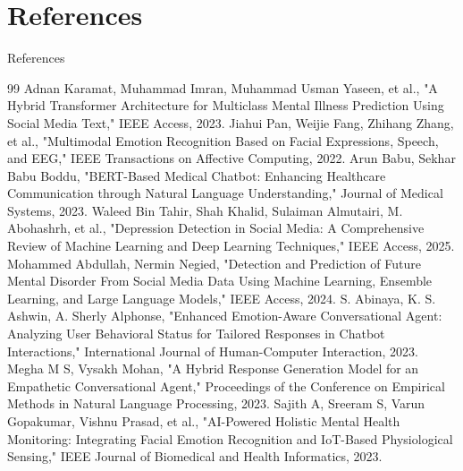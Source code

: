 \documentclass[11pt]{beamer}
\begin{document}
\section{References}
\begin{frame}[allowframebreaks]{References}
    \justifying
    \footnotesize
    \begin{thebibliography}{99}
     Adnan Karamat, Muhammad Imran, Muhammad Usman Yaseen, et al., "A Hybrid Transformer Architecture for Multiclass Mental Illness Prediction Using Social Media Text," IEEE Access, 2023.
     Jiahui Pan, Weijie Fang, Zhihang Zhang, et al., "Multimodal Emotion Recognition Based on Facial Expressions, Speech, and EEG," IEEE Transactions on Affective Computing, 2022.
     Arun Babu, Sekhar Babu Boddu, "BERT-Based Medical Chatbot: Enhancing Healthcare Communication through Natural Language Understanding," Journal of Medical Systems, 2023.
     Waleed Bin Tahir, Shah Khalid, Sulaiman Almutairi, M. Abohashrh, et al., "Depression Detection in Social Media: A Comprehensive Review of Machine Learning and Deep Learning Techniques," IEEE Access, 2025.
     Mohammed Abdullah, Nermin Negied, "Detection and Prediction of Future Mental Disorder From Social Media Data Using Machine Learning, Ensemble Learning, and Large Language Models," IEEE Access, 2024.
     S. Abinaya, K. S. Ashwin, A. Sherly Alphonse, "Enhanced Emotion-Aware Conversational Agent: Analyzing User Behavioral Status for Tailored Responses in Chatbot Interactions," International Journal of Human-Computer Interaction, 2023.
     Megha M S, Vysakh Mohan, "A Hybrid Response Generation Model for an Empathetic Conversational Agent," Proceedings of the Conference on Empirical Methods in Natural Language Processing, 2023.
     Sajith A, Sreeram S, Varun Gopakumar, Vishnu Prasad, et al., "AI-Powered Holistic Mental Health Monitoring: Integrating Facial Emotion Recognition and IoT-Based Physiological Sensing," IEEE Journal of Biomedical and Health Informatics, 2023.
    

\end{thebibliography}
\end{frame}
\end{document}
